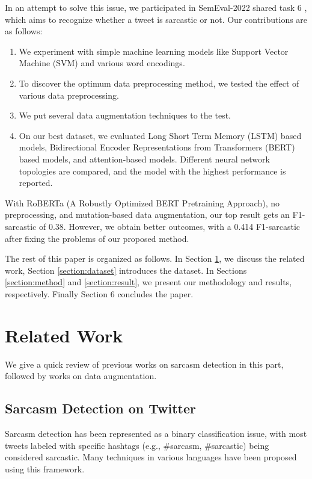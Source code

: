 \documentclass[11pt]{article}
\begin{document}
In an attempt to solve this issue, we participated in SemEval-2022 shared task 6 \cite{abufarha-etal-2022-semeval}, which aims to recognize whether a tweet is sarcastic or not. Our contributions are as follows:
\begin{enumerate}
  \itemsep0em 
  \item {We experiment with simple machine learning models like Support Vector Machine (SVM) and various word encodings. }
  \item {To discover the optimum data preprocessing method, we tested the effect of various data preprocessing. }
  \item {We put several data augmentation techniques to the test. }
  \item {On our best dataset, we evaluated Long Short Term Memory (LSTM) based models, Bidirectional Encoder Representations from Transformers (BERT) based models, and attention-based models. Different neural network topologies are compared, and the model with the highest performance is reported.}
\end{enumerate}
With RoBERTa (A Robustly Optimized BERT Pretraining Approach), no preprocessing, and mutation-based data augmentation, our top result gets an F1-sarcastic of 0.38. However, we obtain better outcomes, with a 0.414 F1-sarcastic after fixing the problems of our proposed method.

The rest of this paper is organized as follows. In Section \ref{section:related}, we discuss the related work, Section \ref{section:dataset} introduces the dataset. In Sections \ref{section:method} and \ref{section:result}, we present our methodology and results, respectively. Finally Section 6 concludes the paper.

\section{Related Work}
\label{section:related}

We give a quick review of previous works on sarcasm detection in this part, followed by works on data augmentation.

\subsection{Sarcasm Detection on Twitter}
Sarcasm detection has been represented as a binary classification issue, with most tweets labeled with specific hashtags (e.g., \#sarcasm, \#sarcastic) being considered sarcastic. Many techniques in various languages have been proposed using this framework.
\end{document}
